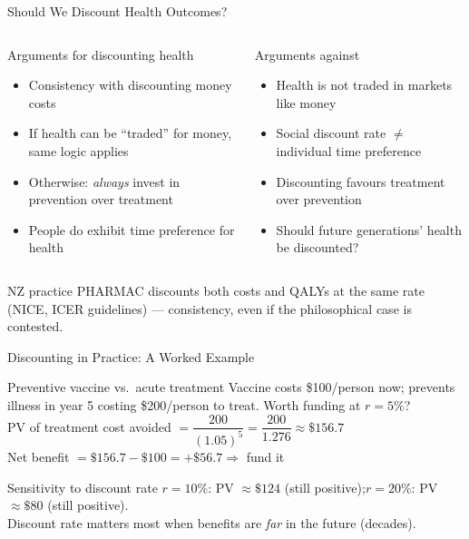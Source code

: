 \documentclass[aspectratio=169, 12pt]{beamer}
\begin{document}
\begin{frame}{Should We Discount Health Outcomes?}
  \begin{columns}
      \begin{block}{Arguments for discounting health}
        \footnotesize
        \begin{itemize}
          \item Consistency with discounting money costs
          \item If health can be ``traded'' for money, same logic applies
          \item Otherwise: \emph{always} invest in prevention over treatment
          \item People do exhibit time preference for health
        \end{itemize}
      \end{block}
      \begin{alertblock}{Arguments against}
        \footnotesize
        \begin{itemize}
          \item Health is not traded in markets like money
          \item Social discount rate $\neq$ individual time preference
          \item Discounting favours treatment over prevention
          \item Should future generations' health be discounted?
        \end{itemize}
      \end{alertblock}
  \end{columns}
  \vspace{0.1em}
  \begin{exampleblock}{NZ practice}
    \footnotesize PHARMAC discounts both costs and QALYs at the same rate (NICE, ICER guidelines) --- consistency, even if the philosophical case is contested.
  \end{exampleblock}
\end{frame}

\begin{frame}{Discounting in Practice: A Worked Example}
  \begin{block}{Preventive vaccine vs.\ acute treatment}
    \small Vaccine costs \$100/person now; prevents illness in year 5 costing \$200/person to treat. Worth funding at $r = 5\%$?\\[0.2em]
    PV of treatment cost avoided $= \dfrac{200}{(1.05)^5} = \dfrac{200}{1.276} \approx \$156.7$\\[0.1em]
    Net benefit $= \$156.7 - \$100 = +\$56.7 \Rightarrow$ fund it
  \end{block}
  \vspace{0.2em}
  \begin{alertblock}{Sensitivity to discount rate}
    \small $r = 10\%$: PV $\approx \$124$ (still positive);\quad $r = 20\%$: PV $\approx \$80$ (still positive).\\
    Discount rate matters most when benefits are \emph{far} in the future (decades).
  \end{alertblock}
\end{frame}
\end{document}
